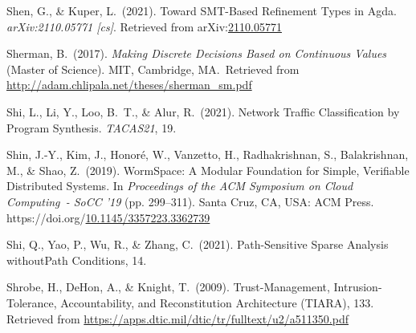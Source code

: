 \documentclass[12pt,twoside]{article}
\begin{document}
{\begin{thebibliography}{1079}
\mdbibitemlabel{}Shen, G., \& Kuper, L.~(2021). Toward SMT-Based Refinement Types in Agda. \emph{arXiv:2110.05771 {}[cs]}. Retrieved from arXiv:\href{http://arxiv.org/abs/2110.05771}{2110.05771}%

\mdbibitemlabel{}Sherman, B.~(2017). \emph{Making Discrete Decisions Based on Continuous Values} (Master of Science). MIT, Cambridge, MA.~Retrieved from \href{http://adam.chlipala.net/theses/sherman_sm.pdf}{{\ttfamily http://\hspace{0pt}adam.\hspace{0pt}chlipala.\hspace{0pt}net/\hspace{0pt}theses/\hspace{0pt}sherman\_\hspace{0pt}sm.\hspace{0pt}pdf}}%

\mdbibitemlabel{}Shi, L., Li, Y., Loo, B.~T., \& Alur, R.~(2021). Network Traﬃc Classiﬁcation by Program Synthesis. \emph{TACAS21}, 19.%

\mdbibitemlabel{}Shin, J.-Y., Kim, J., Honoré, W., Vanzetto, H., Radhakrishnan, S., Balakrishnan, M., \& Shao, Z.~(2019). WormSpace: A Modular Foundation for Simple, Verifiable Distributed Systems. In \emph{Proceedings of the ACM Symposium on Cloud Computing~- SoCC ’19} (pp. 299–311). Santa Cruz, CA, USA: ACM Press. https://doi.org/\href{https://dx.doi.org/10.1145/3357223.3362739}{10.1145/3357223.3362739}%

\mdbibitemlabel{}Shi, Q., Yao, P., Wu, R., \& Zhang, C.~(2021). Path-Sensitive Sparse Analysis withoutPath Conditions, 14.%

\mdbibitemlabel{}Shrobe, H., DeHon, A., \& Knight, T.~(2009). Trust-Management, Intrusion-Tolerance, Accountability, and Reconstitution Architecture (TIARA), 133. Retrieved from \href{https://apps.dtic.mil/dtic/tr/fulltext/u2/a511350.pdf}{{\ttfamily https://\hspace{0pt}apps.\hspace{0pt}dtic.\hspace{0pt}mil/\hspace{0pt}dtic/\hspace{0pt}tr/\hspace{0pt}fulltext/\hspace{0pt}u2/\hspace{0pt}a511350.\hspace{0pt}pdf}}%


\end{thebibliography}}
\end{document}
